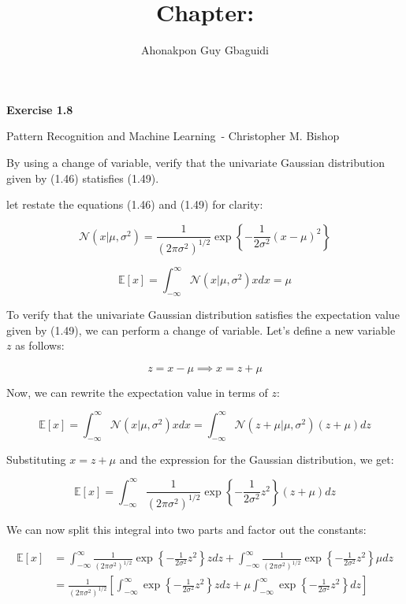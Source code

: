 \documentclass{article}
\title{Chapter: \ChapterName}
\author{Ahonakpon Guy Gbaguidi}
\date{}
\newcommand{\BookName}{Pattern Recognition and Machine Learning}
\newcommand{\BookAuthor}{Christopher M. Bishop}
\newcommand{\ExerciseID}{1.8}
\begin{document}
\maketitle

\begin{center}
  \large\textbf{Exercise \ExerciseID}

  \vspace{0.5em}

  \normalsize\BookName\ - \BookAuthor
\end{center}

\begin{tcolorbox}[breakable,colback=gray!5,colframe=gray!60,title=Solution]
By using a change of variable, verify that the univariate Gaussian distribution 
given by (1.46) statisfies (1.49).

let restate the equations (1.46) and (1.49) for clarity:

\begin{equation}
  \mathcal{N}(x|\mu,\sigma^2) = \frac{1}{\left(2\pi\sigma^2\right)^{1/2}} \exp\left\{-\frac{1}{2\sigma^2}(x-\mu)^2\right\} \tag{1.46}
\end{equation}

\begin{equation}
  \mathbb{E}[x] = \int_{-\infty}^{\infty} \mathcal{N}(x|\mu,\sigma^2) x dx = \mu \tag{1.49}
\end{equation}

To verify that the univariate Gaussian distribution satisfies the expectation value given by (1.49), we can perform a change of variable. Let's define a new variable \( z \) as follows:

\[
z = x - \mu \implies x = z + \mu
\]

Now, we can rewrite the expectation value in terms of \( z \):

\[
\mathbb{E}[x] = \int_{-\infty}^{\infty} \mathcal{N}(x|\mu,\sigma^2) x dx = \int_{-\infty}^{\infty} \mathcal{N}(z + \mu|\mu,\sigma^2) (z + \mu) dz
\]

Substituting \( x = z + \mu \) and the expression for the Gaussian distribution, we get:

\[
\mathbb{E}[x] = \int_{-\infty}^{\infty} \frac{1}{\left(2\pi\sigma^2\right)^{1/2}} \exp\left\{-\frac{1}{2\sigma^2} z^2\right\} (z + \mu) dz
\]

We can now split this integral into two parts and factor out the constants:

\begin{align*}
  \mathbb{E}[x] &= \int_{-\infty}^{\infty} \frac{1}{\left(2\pi\sigma^2\right)^{1/2}} \exp\left\{-\frac{1}{2\sigma^2} z^2\right\} z dz + \int_{-\infty}^{\infty} \frac{1}{\left(2\pi\sigma^2\right)^{1/2}} \exp\left\{-\frac{1}{2\sigma^2} z^2\right\} \mu dz \\
  &= \frac{1}{\left(2\pi\sigma^2\right)^{1/2}} \left[ \int_{-\infty}^{\infty} \exp\left\{-\frac{1}{2\sigma^2} z^2\right\} z dz + \mu \int_{-\infty}^{\infty} \exp\left\{-\frac{1}{2\sigma^2} z^2\right\} dz \right]
\end{align*}


\end{tcolorbox}
\end{document}
